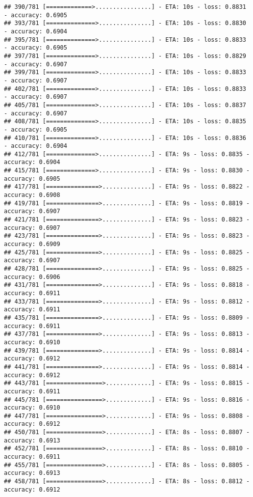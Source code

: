 \documentclass[
]{article}
\begin{document}
\begin{verbatim}
## 390/781 [=============>................] - ETA: 10s - loss: 0.8831 - accuracy: 0.6905
## 393/781 [==============>...............] - ETA: 10s - loss: 0.8830 - accuracy: 0.6904
## 395/781 [==============>...............] - ETA: 10s - loss: 0.8833 - accuracy: 0.6905
## 397/781 [==============>...............] - ETA: 10s - loss: 0.8829 - accuracy: 0.6907
## 399/781 [==============>...............] - ETA: 10s - loss: 0.8833 - accuracy: 0.6907
## 402/781 [==============>...............] - ETA: 10s - loss: 0.8833 - accuracy: 0.6907
## 405/781 [==============>...............] - ETA: 10s - loss: 0.8837 - accuracy: 0.6907
## 408/781 [==============>...............] - ETA: 10s - loss: 0.8835 - accuracy: 0.6905
## 410/781 [==============>...............] - ETA: 10s - loss: 0.8836 - accuracy: 0.6904
## 412/781 [==============>...............] - ETA: 9s - loss: 0.8835 - accuracy: 0.6904 
## 415/781 [==============>...............] - ETA: 9s - loss: 0.8830 - accuracy: 0.6905
## 417/781 [===============>..............] - ETA: 9s - loss: 0.8822 - accuracy: 0.6908
## 419/781 [===============>..............] - ETA: 9s - loss: 0.8819 - accuracy: 0.6907
## 421/781 [===============>..............] - ETA: 9s - loss: 0.8823 - accuracy: 0.6907
## 423/781 [===============>..............] - ETA: 9s - loss: 0.8823 - accuracy: 0.6909
## 425/781 [===============>..............] - ETA: 9s - loss: 0.8825 - accuracy: 0.6907
## 428/781 [===============>..............] - ETA: 9s - loss: 0.8825 - accuracy: 0.6906
## 431/781 [===============>..............] - ETA: 9s - loss: 0.8818 - accuracy: 0.6911
## 433/781 [===============>..............] - ETA: 9s - loss: 0.8812 - accuracy: 0.6911
## 435/781 [===============>..............] - ETA: 9s - loss: 0.8809 - accuracy: 0.6911
## 437/781 [===============>..............] - ETA: 9s - loss: 0.8813 - accuracy: 0.6910
## 439/781 [===============>..............] - ETA: 9s - loss: 0.8814 - accuracy: 0.6912
## 441/781 [===============>..............] - ETA: 9s - loss: 0.8814 - accuracy: 0.6912
## 443/781 [================>.............] - ETA: 9s - loss: 0.8815 - accuracy: 0.6911
## 445/781 [================>.............] - ETA: 9s - loss: 0.8816 - accuracy: 0.6910
## 447/781 [================>.............] - ETA: 9s - loss: 0.8808 - accuracy: 0.6912
## 450/781 [================>.............] - ETA: 8s - loss: 0.8807 - accuracy: 0.6913
## 452/781 [================>.............] - ETA: 8s - loss: 0.8810 - accuracy: 0.6911
## 455/781 [================>.............] - ETA: 8s - loss: 0.8805 - accuracy: 0.6913
## 458/781 [================>.............] - ETA: 8s - loss: 0.8812 - accuracy: 0.6912

\end{verbatim}
\end{document}
